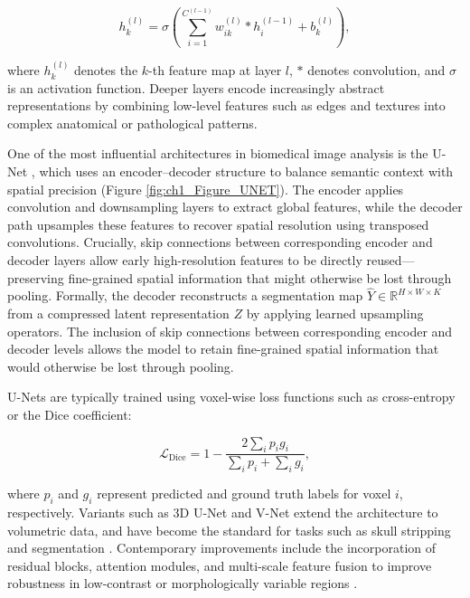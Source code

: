 \begin{equation}
    h^{(l)}_k = \sigma\left( \sum_{i=1}^{C^{(l-1)}} w^{(l)}_{ik} * h^{(l-1)}_i + b^{(l)}_k \right),
\end{equation}

where $h^{(l)}_k$ denotes the \(k\)-th feature map at layer \(l\), $*$ denotes convolution, and \(\sigma\) is an activation function. Deeper layers encode increasingly abstract representations by combining low-level features such as edges and textures into complex anatomical or pathological patterns.

One of the most influential architectures in biomedical image analysis is the U-Net \cite{Ronneberger2015-xm}, which uses an encoder–decoder structure to balance semantic context with spatial precision (Figure \ref{fig:ch1_Figure_UNET}). The encoder applies convolution and downsampling layers to extract global features, while the decoder path upsamples these features to recover spatial resolution using transposed convolutions. Crucially, skip connections between corresponding encoder and decoder layers allow early high-resolution features to be directly reused—preserving fine-grained spatial information that might otherwise be lost through pooling. Formally, the decoder reconstructs a segmentation map $\hat{Y} \in \mathbb{R}^{H \times W \times K}$ from a compressed latent representation $Z$ by applying learned upsampling operators. The inclusion of skip connections between corresponding encoder and decoder levels allows the model to retain fine-grained spatial information that would otherwise be lost through pooling.

U-Nets are typically trained using voxel-wise loss functions such as cross-entropy or the Dice coefficient:

\begin{equation}
    \mathcal{L}_{\text{Dice}} = 1 - \frac{2 \sum_i p_i g_i}{\sum_i p_i + \sum_i g_i},
\end{equation}

where $p_i$ and $g_i$ represent predicted and ground truth labels for voxel $i$, respectively. Variants such as 3D U-Net \cite{Cicek2016-dz} and V-Net \cite{Milletari2016-ra} extend the architecture to volumetric data, and have become the standard for tasks such as skull stripping \cite{Hoopes2022-al} and segmentation \cite{Billot2023-tl, DeKraker2022-gj}. Contemporary improvements include the incorporation of residual blocks, attention modules, and multi-scale feature fusion to improve robustness in low-contrast or morphologically variable regions \cite{Oktay2018-rh}. 

